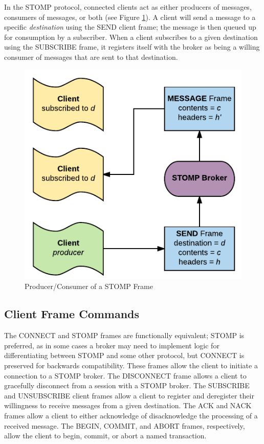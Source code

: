 \documentclass[conference, letterpaper]{IEEEtran}
\begin{document}
In the STOMP protocol, connected clients act as either producers of messages, consumers of messages, or both (see Figure \ref{stompsend}). A client will send a message to a specific \textit{destination} using the SEND client frame; the message is then queued up for consumption by a subscriber. When a client subscribes to a given destination using the SUBSCRIBE frame, it registers itself with the broker as being a willing consumer of messages that are sent to that destination.

   \begin{figure}[h]
        \centering
        \ifCLASSINFOpdf
             \includegraphics[scale=.75]{send.pdf}
         \else
        \fi
        \caption{Producer/Consumer of a STOMP Frame}
        \label{stompsend}
    \end{figure}


\subsection{Client Frame Commands}

The CONNECT and STOMP frames are functionally equivalent; STOMP is preferred, as in some cases a broker may need to implement logic for differentiating between STOMP and some other protocol, but CONNECT is preserved for backwards compatibility. These frames allow the client to initiate a connection to a STOMP broker. The DISCONNECT frame allows a client to gracefully disconnect from a session with a STOMP broker. The SUBSCRIBE and UNSUBSCRIBE client frames allow a client to register and deregister their willingness to receive messages from a given destination. The ACK and NACK frames allow a client to either acknowledge of disacknowledge the processing of a received message. The BEGIN, COMMIT, and ABORT frames, respectively, allow the client to begin, commit, or abort a named transaction.
\end{document}
